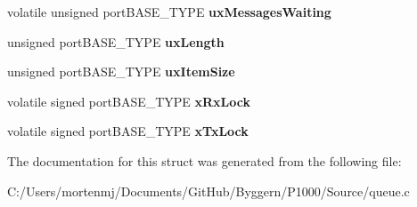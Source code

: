 \begin{DoxyCompactItemize}
\item 
\hypertarget{struct_queue_definition_a8e3b24b25631daa65cc8b860346013e3}{volatile unsigned port\-B\-A\-S\-E\-\_\-\-T\-Y\-P\-E {\bfseries ux\-Messages\-Waiting}}\label{struct_queue_definition_a8e3b24b25631daa65cc8b860346013e3}

\item 
\hypertarget{struct_queue_definition_af1edbb7426dad16a57e1fc6bb475bc7e}{unsigned port\-B\-A\-S\-E\-\_\-\-T\-Y\-P\-E {\bfseries ux\-Length}}\label{struct_queue_definition_af1edbb7426dad16a57e1fc6bb475bc7e}

\item 
\hypertarget{struct_queue_definition_ad8719a7d6da96299b7ed158a621ae7e5}{unsigned port\-B\-A\-S\-E\-\_\-\-T\-Y\-P\-E {\bfseries ux\-Item\-Size}}\label{struct_queue_definition_ad8719a7d6da96299b7ed158a621ae7e5}

\item 
\hypertarget{struct_queue_definition_a55d7241c91d75f3bf4ad4032aeaaf824}{volatile signed port\-B\-A\-S\-E\-\_\-\-T\-Y\-P\-E {\bfseries x\-Rx\-Lock}}\label{struct_queue_definition_a55d7241c91d75f3bf4ad4032aeaaf824}

\item 
\hypertarget{struct_queue_definition_a393aeeb16596b1be505014b57158c995}{volatile signed port\-B\-A\-S\-E\-\_\-\-T\-Y\-P\-E {\bfseries x\-Tx\-Lock}}\label{struct_queue_definition_a393aeeb16596b1be505014b57158c995}

\end{DoxyCompactItemize}


The documentation for this struct was generated from the following file\-:\begin{DoxyCompactItemize}
\item 
C\-:/\-Users/mortenmj/\-Documents/\-Git\-Hub/\-Byggern/\-P1000/\-Source/queue.\-c\end{DoxyCompactItemize}
